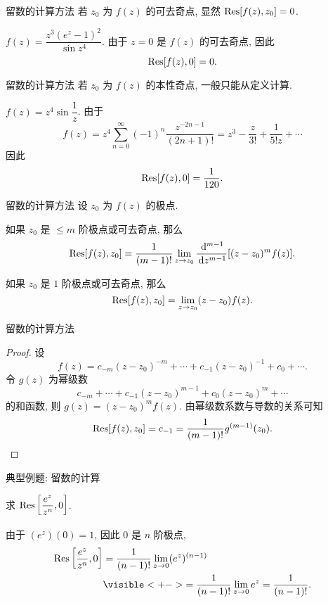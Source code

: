 \begin{frame}{留数的计算方法}
\onslide<+->
若 $z_0$ 为 $f(z)$ 的可去奇点, 显然 ${\mathrm{Res}}[f(z),z_0]=0$.
\begin{example}
$f(z)=\dfrac{z^3(e^z-1)^2}{\sin z^4}$.
\onslide<+->
由于 $z=0$ 是 $f(z)$ 的可去奇点,
\onslide<+->
因此
\[{\mathrm{Res}}[f(z),0]=0.\]
\end{example}
\end{frame}


\begin{frame}{留数的计算方法}
\onslide<+->
若 $z_0$ 为 $f(z)$ 的本性奇点, 一般只能从定义计算.
\begin{example}
$f(z)=z^4\sin\dfrac1z$.
\onslide<+->
由于
\[f(z)=z^4\sum_{n=0}^\infty(-1)^n\frac{z^{-2n-1}}{(2n+1)!}
=z^3-\frac z{3!}+\frac1{5!z}+\cdots\]
\onslide<+->
因此
\[{\mathrm{Res}}[f(z),0]=\frac1{120}.\]
\end{example}
\end{frame}


\begin{frame}{留数的计算方法}
设 $z_0$ 为 $f(z)$ 的极点.
\begin{conclusion}[极点留数计算公式 I]
如果 $z_0$ 是 $\le m$ 阶极点或可去奇点, 那么
\[{\mathrm{Res}}[f(z),z_0]=\frac1{(m-1)!}\lim_{z\to z_0}\frac{\,\mathrm{d}^{m-1}}{\,\mathrm{d} z^{m-1}}[(z-z_0)^mf(z)].\]
\end{conclusion}

\begin{conclusion}[极点留数计算公式 II]
如果 $z_0$ 是 $1$ 阶极点或可去奇点, 那么
\[{\mathrm{Res}}[f(z),z_0]=\lim\limits_{z\to z_0}(z-z_0)f(z).\]
\end{conclusion}
\end{frame}


\begin{frame}{留数的计算方法}
\begin{proof}
设
\[f(z)=c_{-m}(z-z_0)^{-m}+\cdots+c_{-1}(z-z_0)^{-1}+c_0+\cdots.\]
\onslide<+->
令 $g(z)$ 为幂级数
\[c_{-m}+\cdots+c_{-1}(z-z_0)^{m-1}+c_0(z-z_0)^m+\cdots\]
的和函数, 则 $g(z)=(z-z_0)^mf(z)$.
\onslide<+->
由幂级数系数与导数的关系可知
\[{\mathrm{Res}}[f(z),z_0]=c_{-1}=\dfrac1{(m-1)!}g^{(m-1)}(z_0).\qedhere\]
\end{proof}
\end{frame}


\begin{frame}{典型例题: 留数的计算}
\begin{example}
求 ${\mathrm{Res}}\left[\dfrac{e^z}{z^n},0\right]$.
\end{example}
\begin{solution}
由于 $(e^z)(0)=1$, 因此 $0$ 是 $n$ 阶极点,
\onslide<+->
\begin{align*}
\Res\left[\frac{e^z}{z^n},0\right]&=\frac1{(n-1)!}\lim_{z\to0}(e^z)^{(n-1)}\\
&\visible<+->{=\frac1{(n-1)!}\lim_{z\to0}e^z=\frac1{(n-1)!}.}
\end{align*}
\end{solution}
\end{frame}


